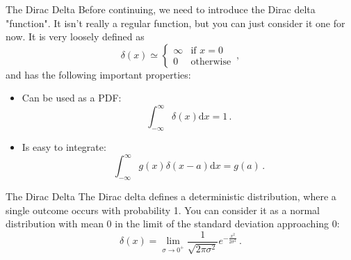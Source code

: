 \documentclass[10pt]{beamer}
\begin{document}
\begin{frame}[fragile]{The Dirac Delta}
Before continuing, we need to introduce the Dirac delta "function". It isn't really a regular function, but you can just consider it one for now. It is very loosely defined as
\begin{equation*}
    \delta\left(x\right) \simeq
    \begin{cases}
        \infty & \textrm{if } x = 0\\
        0 & \textrm{otherwise}
    \end{cases}\,,
\end{equation*}
and has the following important properties:
\begin{itemize}[<+->]
    \item Can be used as a PDF:
    \begin{equation*}
        \int_{-\infty}^\infty\delta\left(x\right)\mathrm{d}x = 1\,.
    \end{equation*}
    \item Is easy to integrate:
    \begin{equation*}
        \int_{-\infty}^\infty g\left(x\right)\delta\left(x - a\right)\mathrm{d}x = g\left(a\right)\,.
    \end{equation*}
\end{itemize}
\end{frame}

\begin{frame}[fragile]{The Dirac Delta}
The Dirac delta defines a deterministic distribution, where a single outcome occurs with probability 1. You can consider it as a normal distribution with mean 0 in the limit of the standard deviation approaching 0:
\begin{equation*}
    \delta\left(x\right) = \lim_{\sigma\rightarrow 0^+}\frac{1}{\sqrt{2\pi\sigma^2}}e^{-\frac{x^2}{2\sigma^2}}\,.
\end{equation*}
\end{frame}
\end{document}
